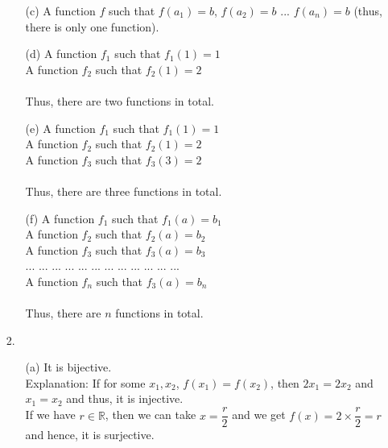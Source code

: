 \documentclass[12pt, a4paper]{article}
\newcommand{\reals}{\mathbb{R}}
\begin{document}
\begin{itemize}
\begin{itemize}
\item[]

\item[(c)]
A function $f$ such that $f(a_1) = b$, $f(a_2) = b$ ... $f(a_n) = b$ (thus, there is only one function).

\item[]

\item[(d)]
A function $f_1$ such that $f_1(1) = 1$\\
A function $f_2$ such that $f_2(1) = 2$\\\\
Thus, there are two functions in total.

\item[]

\item[(e)]
A function $f_1$ such that $f_1(1) = 1$\\
A function $f_2$ such that $f_2(1) = 2$\\
A function $f_3$ such that $f_3(3) = 2$\\\\
Thus, there are three functions in total.

\item[]

\item[(f)]
A function $f_1$ such that $f_1(a) = b_1$\\
A function $f_2$ such that $f_2(a) = b_2$\\
A function $f_3$ such that $f_3(a) = b_3$\\
... ... ... ... ... ... ... ... ... ... ... ...\\
A function $f_n$ such that $f_3(a) = b_n$\\\\
Thus, there are $n$ functions in total.
\end{itemize}

\item[]
\item[]

\item[2.]
\begin{itemize}
\item[(a)]
It is bijective.\\
Explanation: If for some $x_1, x_2$, $f(x_1) = f(x_2)$, then $2x_1 = 2x_2$ and $x_1 = x_2$ and thus, it is injective.\\
If we have $r \in \reals$, then we can take $x = \dfrac{r}{2}$ and we get $f(x) = 2 \times \dfrac{r}{2} = r$ and hence, it is surjective.


\end{itemize}
\end{itemize}
\end{document}
